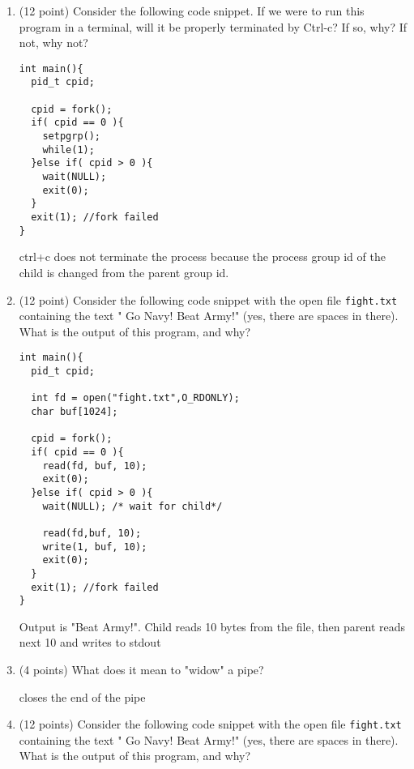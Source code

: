 \documentclass{article}[9pt]
\newenvironment{answerfont}{\fontfamily{qhv}\selectfont}{\par}
\newenvironment{myanswer}{\begin{mdframed}\begin{answerfont}}{\end{answerfont}\end{mdframed}}
\begin{document}
\begin{enumerate}
\item (12 point) Consider the following code snippet. If we were to run this
program in a terminal, will it be properly terminated by Ctrl-c?
If so, why? If not, why not?

\begin{verbatim}
int main(){
  pid_t cpid;

  cpid = fork();
  if( cpid == 0 ){
    setpgrp();
    while(1);
  }else if( cpid > 0 ){
    wait(NULL);
    exit(0);
  }
  exit(1); //fork failed
}
\end{verbatim}

  \begin{myanswer}
  ctrl+c does not terminate the process because the process group id of the child is changed from the parent group id.
  \end{myanswer}


\item (12 point) Consider the following code snippet with the open file
\texttt{fight.txt} containing the text " Go Navy! Beat Army!" (yes,
there are spaces in there).  What is the output of this program,
and why?

\begin{verbatim}
int main(){
  pid_t cpid;

  int fd = open("fight.txt",O_RDONLY);
  char buf[1024];

  cpid = fork();
  if( cpid == 0 ){
    read(fd, buf, 10);
    exit(0);
  }else if( cpid > 0 ){
    wait(NULL); /* wait for child*/

    read(fd,buf, 10);
    write(1, buf, 10);
    exit(0);
  }
  exit(1); //fork failed
}
\end{verbatim}

  \begin{myanswer}
  Output is "Beat Army!". Child reads 10 bytes from the file, then parent reads next 10 and writes to stdout
  \end{myanswer}


\item (4 points) What does it mean to "widow" a pipe?

  \begin{myanswer}
  closes the end of the pipe
  \end{myanswer}


\item (12 points) Consider the following code snippet with the open file
\texttt{fight.txt} containing the text " Go Navy! Beat Army!" (yes,
there are spaces in there).  What is the output of this program,
and why?


\end{enumerate}
\end{document}
